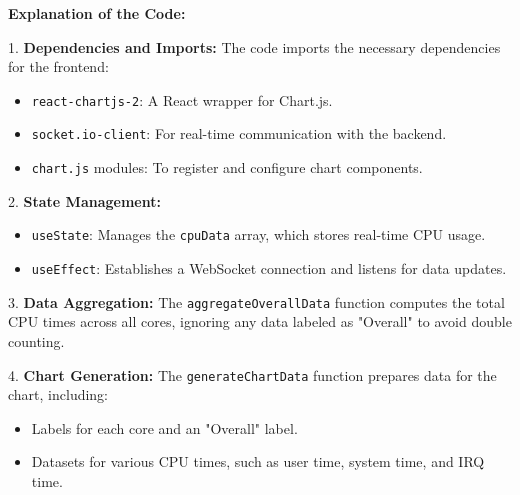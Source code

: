 \documentclass[12pt]{article}
\begin{document}




\textbf{Explanation of the Code:}

1. \textbf{Dependencies and Imports:}
   The code imports the necessary dependencies for the frontend:
   \begin{itemize}
       \item \texttt{react-chartjs-2}: A React wrapper for Chart.js.
       \item \texttt{socket.io-client}: For real-time communication with the backend.
       \item \texttt{chart.js} modules: To register and configure chart components.
   \end{itemize}

2. \textbf{State Management:}
   \begin{itemize}
       \item \texttt{useState}: Manages the \texttt{cpuData} array, which stores real-time CPU usage.
       \item \texttt{useEffect}: Establishes a WebSocket connection and listens for data updates.
   \end{itemize}

3. \textbf{Data Aggregation:}
   The \texttt{aggregateOverallData} function computes the total CPU times across all cores, ignoring any data labeled as "Overall" to avoid double counting.

4. \textbf{Chart Generation:}
   The \texttt{generateChartData} function prepares data for the chart, including:
   \begin{itemize}
       \item Labels for each core and an "Overall" label.
       \item Datasets for various CPU times, such as user time, system time, and IRQ time.
   \end{itemize}
\end{document}
